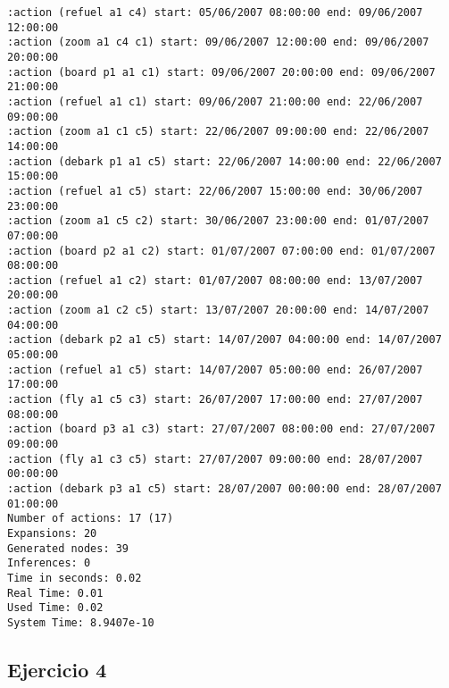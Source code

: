 \documentclass{article}
\begin{document}
\begin{lstlisting}
:action (refuel a1 c4) start: 05/06/2007 08:00:00 end: 09/06/2007 12:00:00
:action (zoom a1 c4 c1) start: 09/06/2007 12:00:00 end: 09/06/2007 20:00:00
:action (board p1 a1 c1) start: 09/06/2007 20:00:00 end: 09/06/2007 21:00:00
:action (refuel a1 c1) start: 09/06/2007 21:00:00 end: 22/06/2007 09:00:00
:action (zoom a1 c1 c5) start: 22/06/2007 09:00:00 end: 22/06/2007 14:00:00
:action (debark p1 a1 c5) start: 22/06/2007 14:00:00 end: 22/06/2007 15:00:00
:action (refuel a1 c5) start: 22/06/2007 15:00:00 end: 30/06/2007 23:00:00
:action (zoom a1 c5 c2) start: 30/06/2007 23:00:00 end: 01/07/2007 07:00:00
:action (board p2 a1 c2) start: 01/07/2007 07:00:00 end: 01/07/2007 08:00:00
:action (refuel a1 c2) start: 01/07/2007 08:00:00 end: 13/07/2007 20:00:00
:action (zoom a1 c2 c5) start: 13/07/2007 20:00:00 end: 14/07/2007 04:00:00
:action (debark p2 a1 c5) start: 14/07/2007 04:00:00 end: 14/07/2007 05:00:00
:action (refuel a1 c5) start: 14/07/2007 05:00:00 end: 26/07/2007 17:00:00
:action (fly a1 c5 c3) start: 26/07/2007 17:00:00 end: 27/07/2007 08:00:00
:action (board p3 a1 c3) start: 27/07/2007 08:00:00 end: 27/07/2007 09:00:00
:action (fly a1 c3 c5) start: 27/07/2007 09:00:00 end: 28/07/2007 00:00:00
:action (debark p3 a1 c5) start: 28/07/2007 00:00:00 end: 28/07/2007 01:00:00
Number of actions: 17 (17)
Expansions: 20
Generated nodes: 39
Inferences: 0
Time in seconds: 0.02
Real Time: 0.01
Used Time: 0.02
System Time: 8.9407e-10
\end{lstlisting}

\subsection*{Ejercicio 4}
\end{document}
